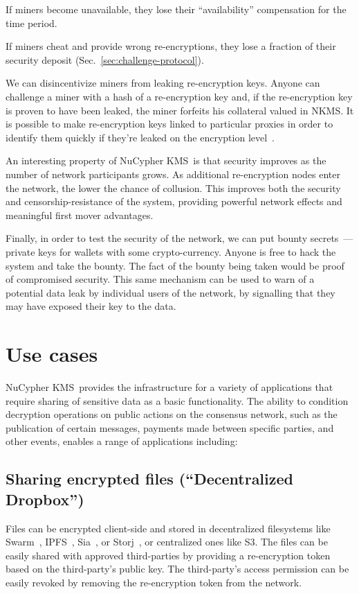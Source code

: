 \documentclass[longbibliography,nofootinbib]{revtex4-1}
\newcommand{\kms}{NuCypher KMS}
\begin{document}
If miners become unavailable, they lose their ``availability'' compensation for the time period.

If miners cheat and provide wrong re-encryptions, they lose a fraction of their security deposit (Sec.~\ref{sec:challenge-protocol}).

We can disincentivize miners from leaking re-encryption keys.
Anyone can challenge a miner with a hash of a re-encryption key and, if the re-encryption key is proven to have been leaked, the miner forfeits his collateral
valued in NKMS.
It is possible to make re-encryption keys linked to particular proxies in order to identify them quickly if they're leaked on the encryption
level~\cite{Libert2008}.

An interesting property of \kms~is that security improves as the number of network participants grows. As additional re-encryption
nodes enter the network, the lower the chance of collusion.
This improves both the security and censorship-resistance of the system, providing powerful network effects and meaningful first mover advantages.

Finally, in order to test the security of the network, we can put bounty secrets~--- private keys for wallets with
some crypto-currency.
Anyone is free to hack the system and take the bounty.
The fact of the bounty being taken would be proof of compromised security.
This same mechanism can be used to warn of a potential data leak by individual users of the network, by signalling that they may have exposed
their key to the data.

\section{Use cases}
\kms~provides the infrastructure for a variety of applications that require sharing of sensitive data as a basic
functionality. The ability to condition decryption operations on public actions on the consensus network, such as the publication
of certain messages, payments made between specific parties, and other events, enables a range of applications including:

\subsection{Sharing encrypted files (``Decentralized Dropbox'')}
\label{sec:files}
Files can be encrypted client-side and stored in decentralized filesystems like Swarm~\cite{swarm}, IPFS~\cite{whitepaper:ipfs}, Sia~\cite{web:sia}, or Storj~\cite{web:storj}, or centralized ones like S3.
The files can be easily shared with approved third-parties by providing a re-encryption token based on the third-party's
public key.
The third-party's access permission can be easily revoked by removing the re-encryption token from the network.
\end{document}
